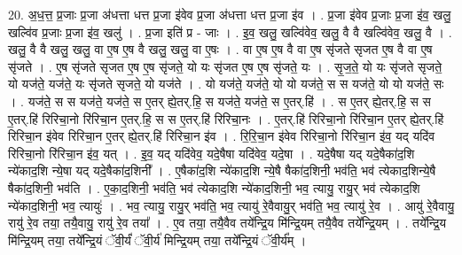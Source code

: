 \documentclass[17pt]{extarticle}
\begin{document}
20. अ॒ध॒त्त॒ प्र॒जाः प्र॒जा अ॑धत्ता धत्त प्र॒जा इ॑वेव प्र॒जा अ॑धत्ता धत्त प्र॒जा इ॑व । . प्र॒जा इ॑वेव प्र॒जाः प्र॒जा इ॑व॒ खलु॒ खल्वि॑व प्र॒जाः प्र॒जा इ॑व॒ खलु॑ । . प्र॒जा इति॑ प्र - जाः । . इ॒व॒ खलु॒ खल्वि॑वेव॒ खलु॒ वै वै खल्वि॑वेव॒ खलु॒ वै । . खलु॒ वै वै खलु॒ खलु॒ वा ए॒ष ए॒ष वै खलु॒ खलु॒ वा ए॒षः । . वा ए॒ष ए॒ष वै वा ए॒ष सृ॑जते सृजत ए॒ष वै वा ए॒ष सृ॑जते । . ए॒ष सृ॑जते सृजत ए॒ष ए॒ष सृ॑जते॒ यो यः सृ॑जत ए॒ष ए॒ष सृ॑जते॒ यः । . सृ॒ज॒ते॒ यो यः सृ॑जते सृजते॒ यो यज॑ते॒ यज॑ते॒ यः सृ॑जते सृजते॒ यो यज॑ते । . यो यज॑ते॒ यज॑ते॒ यो यो यज॑ते॒ स स यज॑ते॒ यो यो यज॑ते॒ सः । . यज॑ते॒ स स यज॑ते॒ यज॑ते॒ स ए॒तर् ह्ये॒तर्.हि॒ स यज॑ते॒ यज॑ते॒ स ए॒तर्.हि॑ । . स ए॒तर् ह्ये॒तर्.हि॒ स स ए॒तर्.हि॑ रिरिचा॒नो रि॑रिचा॒न ए॒तर्.हि॒ स स ए॒तर्.हि॑ रिरिचा॒नः । . ए॒तर्.हि॑ रिरिचा॒नो रि॑रिचा॒न ए॒तर् ह्ये॒तर्.हि॑ रिरिचा॒न इ॑वेव रिरिचा॒न ए॒तर् ह्ये॒तर्.हि॑ रिरिचा॒न इ॑व । . रि॒रि॒चा॒न इ॑वेव रिरिचा॒नो रि॑रिचा॒न इ॑व॒ यद् यदि॑व रिरिचा॒नो रि॑रिचा॒न इ॑व॒ यत् । . इ॒व॒ यद् यदि॑वेव॒ यदे॒षैषा यदि॑वेव॒ यदे॒षा । . यदे॒षैषा यद् यदे॒षैका॑द॒शि न्ये॑काद॒शि न्ये॒षा यद् यदे॒षैका॑द॒शिनी᳚ । . ए॒षैका॑द॒शि न्ये॑काद॒शि न्ये॒षै षैका॑द॒शिनी॒ भव॑ति॒ भव॑ त्येकाद॒शिन्ये॒षै षैका॑द॒शिनी॒ भव॑ति । . ए॒का॒द॒शिनी॒ भव॑ति॒ भव॑ त्येकाद॒शि न्ये॑काद॒शिनी॒ भव॒ त्यायु॒ रायु॒र् भव॑ त्येकाद॒शि न्ये॑काद॒शिनी॒ भव॒ त्यायुः॑ । . भव॒ त्यायु॒ रायु॒र् भव॑ति॒ भव॒ त्यायु॑ रे॒वैवायु॒र् भव॑ति॒ भव॒ त्यायु॑ रे॒व । . आयु॑ रे॒वैवायु॒ रायु॑ रे॒व तया॒ तयै॒वायु॒ रायु॑ रे॒व तया᳚ । . ए॒व तया॒ तयै॒वैव तये᳚न्द्रि॒य मि॑न्द्रि॒यम् तयै॒वैव तये᳚न्द्रि॒यम् । . तये᳚न्द्रि॒य मि॑न्द्रि॒यम् तया॒ तये᳚न्द्रि॒यं ॅवी॒र्यं॑ ॅवी॒र्य॑ मिन्द्रि॒यम् तया॒ तये᳚न्द्रि॒यं ॅवी॒र्य᳚म् । \newline
\end{document}
